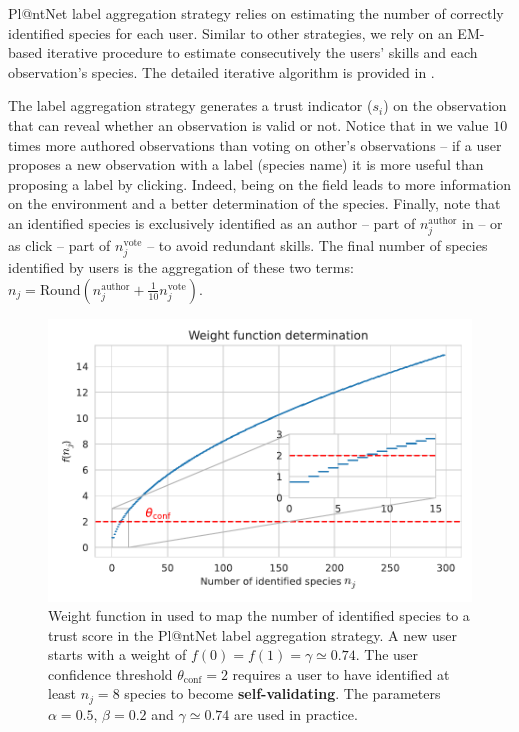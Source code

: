 Pl@ntNet label aggregation strategy relies on estimating the number of correctly identified species for each user.
Similar to other strategies, we rely on an EM-based iterative procedure \citep{Dempster_Laird_Rubin77} to estimate consecutively the users' skills and each observation's species. The detailed iterative algorithm is provided in .

The label aggregation strategy generates a trust indicator ($s_i$) on the observation that can reveal whether an observation is valid or not.
Notice that in  we value $10$ times more authored observations than voting on other's observations -- if a user proposes a new observation with a label (species name) it is more useful than proposing a label by clicking.
Indeed, being on the field leads to more information on the environment and a better determination of the species.
Finally, note that an identified species is exclusively identified as an author -- part of $n_j^\text{author}$ in  -- or as click -- part of $n_j^\text{vote}$ -- to avoid redundant skills.
The final number of species identified by users is the aggregation of these two terms: $n_j = \mathrm{Round}\left(n_j^\text{author} + \frac{1}{10}n_j^\text{vote}\right)$.

\begin{figure}[htb]
    \centering
    \includegraphics[width=.75\textwidth]{./images_plantnet/weight_function.pdf}
    \caption{Weight function in  used to map the number of identified species to a trust score in the Pl@ntNet label aggregation strategy.  A new user starts with a weight of $f(0)=f(1)=\gamma\simeq 0.74$. The user confidence threshold $\theta_{\text{conf}}=2$ requires a user to have identified at least $n_j=8$ species to become \textbf{self-validating}. The parameters $\alpha=0.5$, $\beta=0.2$ and $\gamma\simeq 0.74$ are used in practice.}
    \label{fig:weight_function}
\end{figure}


